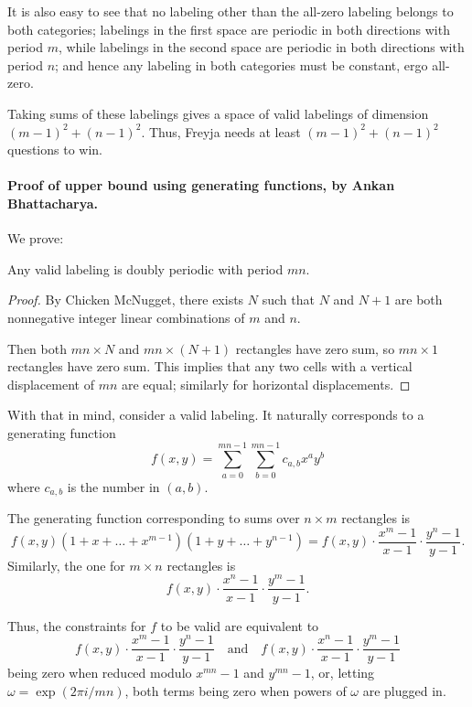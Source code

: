 It is also easy to see that no labeling other than the all-zero labeling
belongs to both categories;
labelings in the first space are periodic in both directions with period $m$,
while labelings in the second space are periodic in both directions with period $n$;
and hence any labeling in both categories must be constant, ergo all-zero.

Taking sums of these labelings gives a space of valid labelings
of dimension $(m-1)^2 + (n-1)^2$.
Thus, Freyja needs at least $(m-1)^2 + (n-1)^2$ questions to win.

\paragraph{Proof of upper bound using generating functions, by Ankan Bhattacharya.}
We prove:
\begin{claim*}[Periodicity]
  Any valid labeling is doubly periodic with period $mn$.
\end{claim*}
\begin{proof}
  By Chicken McNugget, there exists $N$ such that $N$ and $N+1$
  are both nonnegative integer linear combinations of $m$ and $n$.

  Then both $mn \times N$ and $mn \times (N+1)$ rectangles have zero sum,
  so $mn \times 1$ rectangles have zero sum.
  This implies that any two cells with a vertical displacement of $mn$ are equal;
  similarly for horizontal displacements.
\end{proof}

With that in mind, consider a valid labeling.
It naturally corresponds to a generating function
\[ f(x, y) = \sum_{a=0}^{mn-1} \sum_{b=0}^{mn-1} c_{a, b} x^a y^b \]
where $c_{a, b}$ is the number in $(a, b)$.

The generating function corresponding to sums over $n \times m$ rectangles is
\[
  f(x, y) (1 + x + \dots + x^{m-1}) (1 + y + \dots + y^{n-1})
  = f(x, y) \cdot \frac{x^m - 1}{x - 1} \cdot \frac{y^n - 1}{y - 1}.
\]
Similarly, the one for $m \times n$ rectangles is
\[ f(x, y) \cdot \frac{x^n - 1}{x - 1} \cdot \frac{y^m - 1}{y - 1}. \]

Thus, the constraints for $f$ to be valid are equivalent to
\[
  f(x, y) \cdot \frac{x^m - 1}{x - 1} \cdot \frac{y^n - 1}{y - 1}
  \quad \text{and} \quad
  f(x, y) \cdot \frac{x^n - 1}{x - 1} \cdot \frac{y^m - 1}{y - 1}
\]
being zero when reduced modulo $x^{mn} - 1$ and $y^{mn} - 1$,
or, letting $\omega = \exp(2\pi i/mn)$,
both terms being zero when powers of $\omega$ are plugged in.

